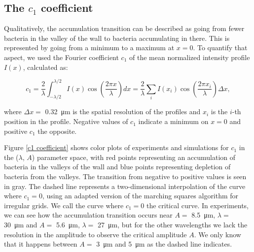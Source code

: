 \subsection{The $c_1$ coefficient}

Qualitatively, the accumulation transition can be described as going from fewer bacteria in the valley of the wall to bacteria accumulating in there. This is represented by going from a minimum to a maximum at $x=0$. To quantify that aspect, we used the Fourier coefficient $c_1$ of the mean normalized intensity profile $I(x)$, calculated as:

\begin{equation}
    c_1 = \frac{2}{\lambda}\int_{-\lambda/2}^{\lambda/2} I(x)\cos\left(\frac{2\pi x}{\lambda} \right)dx = \frac{2}{\lambda} \sum_i I(x_i) \cos\left(\frac{2\pi x_i}{\lambda} \right)\Delta x,
\end{equation}

where $\Delta x=$ \SI{0.32}{\micro\meter} is the spatial resolution of the profiles and $x_i$ is the $i$-th position in the profile. Negative values of $c_1$ indicate a minimum on $x=0$ and positive $c_1$ the opposite.


Figure \ref{c1 coefficient} shows color plots of experiments and simulations for $c_1$ in the  ($\lambda$, $A$) parameter space, with red points representing an accumulation of bacteria in the valleys of the wall and blue points representing depletion of bacteria from the valleys. The transition from negative to positive values is seen in gray. The dashed line represents a two-dimensional interpolation of the curve where $c_1=0$, using an adapted version of the marching squares algorithm for irregular grids. We call the curve where $c_1=0$ the critical curve. In experiments, we can see how the accumulation transition occurs near $A= $ \SI{8.5}{\micro\meter}, $\lambda=$ \SI{30}{\micro\meter} and $A=$ \SI{5.6}{\micro\meter}, $\lambda= $ \SI{27}{\micro\meter}, but for the other wavelengths we lack the resolution in the amplitude to observe the critical amplitude $A$. We only know that it happens between $A=$ \SI{3}{\micro\meter} and \SI{5}{\micro\meter} as the dashed line indicates. 

